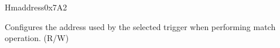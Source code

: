 \begin{register}{H}{maddress}{0x7A2}\label{regdesc:LPMADDRESS}
%
\regnewline%
\begin{regdesc}\begin{reglist}
\label{fielddesc:LPMADDRESS}\item [maddress] Configures the address used by the selected trigger when performing match operation. (R/W)
\end{reglist}\end{regdesc}
\end{register}
